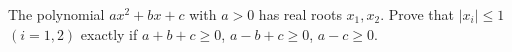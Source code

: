 The polynomial $ax^2 + bx + c$ with $a > 0$ has real roots $x_1, x_2$. Prove that $|x_i| \leq 1$ $(i = 1, 2)$ exactly if $a + b + c \geq 0$, $a - b + c \geq 0$, $a - c \geq 0$.
